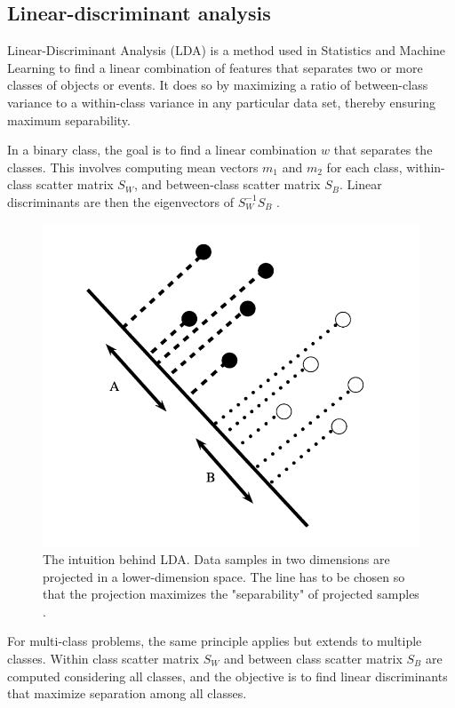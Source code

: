         \subsection{Linear-discriminant analysis}
            Linear-Discriminant Analysis (LDA) is a method used in Statistics and Machine Learning to find a linear combination of features that separates two or more classes of objects or events. It does so by maximizing a ratio of between-class variance to a within-class variance in any particular data set, thereby ensuring maximum separability.

            In a binary class, the goal is to find a linear combination $w$ that separates the classes. This involves computing mean vectors $m_1$ and $m_2$ for each class, within-class scatter matrix $S_W$, and between-class scatter matrix $S_B$. Linear discriminants are then the eigenvectors of $S_W^{-1}S_B$ \cite{xanthopoulos_linear_2013}. 

            \begin{figure}[H]
                \centering
                \includegraphics[width=.6\textwidth]{../src/resources/images/models/lda.png}
                \caption{
                    The intuition behind LDA. Data samples in two dimensions are projected in a lower-dimension space. The line has to be chosen so that the projection maximizes the "separability" of projected samples \cite{xanthopoulos_linear_2013}.
                }
                \label{fig:linear_discriminant_analysis}
            \end{figure}

            For multi-class problems, the same principle applies but extends to multiple classes. Within class scatter matrix $S_W$ and between class scatter matrix $S_B$ are computed considering all classes, and the objective is to find linear discriminants that maximize separation among all classes.  

